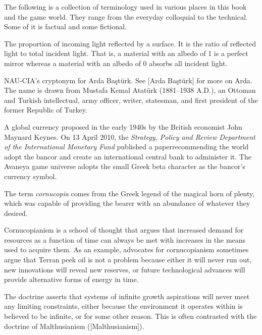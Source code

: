 

The following is a collection of terminology used in various places in this book and the game world. They range from the everyday colloquial to the technical. Some of it is factual and some fictional.

The proportion of incoming light reflected by a surface. It is the ratio of reflected light to total incident light. That is, a material with an albedo of 1 is a perfect mirror whereas a material with an albedo of 0 absorbs all incident light.

NAU-CIA's cryptonym for Arda Baştürk. See [Arda Baştürk] for more on Arda. The name is drawn from Mustafa Kemal Atatürk (1881--1938 A.D.), an Ottoman and Turkish intellectual, army officer, writer, statesman, and first president of the former Republic of Turkey.

A global currency proposed in the early 1940s by the British economist John Maynard Keynes. On 13 April 2010, the {\it Strategy, Policy and Review Department of the International Monetary Fund} published a paper recommending the world adopt the bancor and create an international central bank to administer it. The Avaneya game universe adopts the small Greek beta character  as the bancor's currency symbol.

The term {\it cornucopia} comes from the Greek legend of the magical horn of plenty, which was capable of providing the bearer with an abundance of whatever they desired.

Cornucopianism is a school of thought that argues that increased demand for resources as a function of time can always be met with increases in the means used to acquire them. As an example, advocates for cornucopianism sometimes argue that Terran peek oil is not a problem because either it will never run out, new innovations will reveal new reserves, or future technological advances will provide alternative forms of energy in time. 

The doctrine asserts that systems of infinite growth aspirations will never meet any limiting constraints, either because the environment it operates within is believed to be infinite, or for some other reason. This is often contrasted with the doctrine of Malthusianism ([Malthusianism]).

